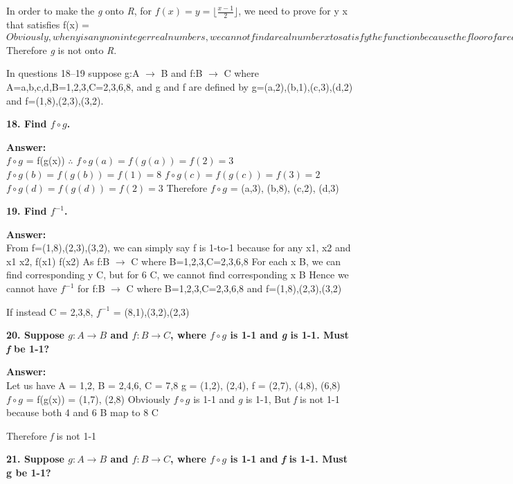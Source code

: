 \documentclass{article}
\begin{document}
\begin{large}
In order to make the \emph{g} onto \emph{R}, 
for $f(x) = y = \lfloor \frac{x-1}{2}\rfloor$, we need to prove for \forall y \exists x that satisfies f(x) = \lfloor {}\rfloor$
Obviously, when y is any non integer real numbers, we cannot find a real number x to satisfy the function because the floor of a real number is always an integer.
Thus it is false that \forall y \exists x that satisfies f(x) = \lfloor \frac{x-1}{2}\rfloor$
Therefore \emph{g} is not onto \emph{R}.


In questions 18–19 suppose g:A $\to$ B and f:B $\to$ C where A={a,b,c,d},B={1,2,3},C={2,3,6,8}, and g and f are defined by g={(a,2),(b,1),(c,3),(d,2)} and f={(1,8),(2,3),(3,2)}.

\textbf{18. Find $f\circ g$.}

\textbf{Answer:} \\

$f \circ g$ = f(g(x))
$\therefore$ $f \circ g(a) = f(g(a)) = f(2) = 3$
             $f \circ g(b) = f(g(b)) = f(1) = 8$
             $f \circ g(c) = f(g(c)) = f(3) = 2$
             $f \circ g(d) = f(g(d)) = f(2) = 3$
Therefore $f \circ g$ = {(a,3), (b,8), (c,2), (d,3)}


\textbf{19. Find $f^{-1}$.}

\textbf{Answer:} \\

From f={(1,8),(2,3),(3,2)}, we can simply say f is 1-to-1 because for any x1, x2  and x1 \neq x2, f(x1) \neq f(x2)
As f:B $\to$ C where B={1,2,3},C={2,3,6,8}
For each x \in B, we can find corresponding y \in C, but for 6 \in C, we cannot find corresponding x \in B
Hence we cannot have $f^{-1}$ for f:B $\to$ C where B={1,2,3},C={2,3,6,8} and f={(1,8),(2,3),(3,2)}

If instead C = {2,3,8}, $f^{-1}$ = {(8,1),(3,2),(2,3)}


\textbf{20. Suppose $g:A\to B$ and $f:B\to C$, where $f\circ g$ is 1-1 and \emph{g} is 1-1. Must \emph{f} be 1-1?}

\textbf{Answer:} \\

Let us have A = {1,2}, B = {2,4,6}, C = {7,8}
g = {(1,2), (2,4)}, f = {(2,7), (4,8), (6,8)}
$f\circ g$ = f(g(x)) = {(1,7), (2,8)}
Obviously $f\circ g$ is 1-1 and \emph{g} is 1-1,
But \emph{f} is not 1-1 because both 4 and 6 \in B map to 8 \in C

Therefore \emph{f} is not 1-1


\textbf{21. Suppose $g:A\to B$ and $f:B\to C$, where $f\circ g$ is 1-1 and \emph{f} is 1-1. Must g be 1-1?}


\end{large}
\end{document}
